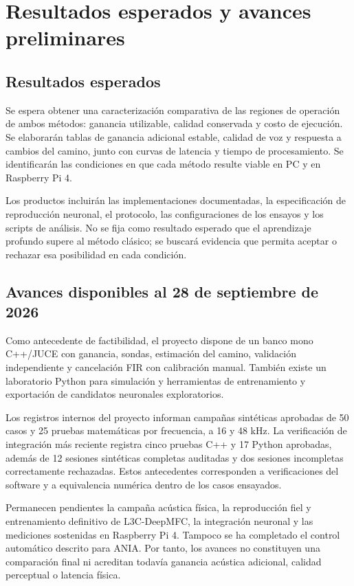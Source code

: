 \section{Resultados esperados y avances preliminares}
\subsection{Resultados esperados}
Se espera obtener una caracterización comparativa de las regiones de operación de ambos métodos: ganancia utilizable, calidad conservada y costo de ejecución. Se elaborarán tablas de ganancia adicional estable, calidad de voz y respuesta a cambios del camino, junto con curvas de latencia y tiempo de procesamiento. Se identificarán las condiciones en que cada método resulte viable en PC y en Raspberry Pi 4.

Los productos incluirán las implementaciones documentadas, la especificación de reproducción neuronal, el protocolo, las configuraciones de los ensayos y los scripts de análisis. No se fija como resultado esperado que el aprendizaje profundo supere al método clásico; se buscará evidencia que permita aceptar o rechazar esa posibilidad en cada condición.

\subsection{Avances disponibles al 28 de septiembre de 2026}
Como antecedente de factibilidad, el proyecto dispone de un banco mono C++/JUCE con ganancia, sondas, estimación del camino, validación independiente y cancelación FIR con calibración manual. También existe un laboratorio Python para simulación y herramientas de entrenamiento y exportación de candidatos neuronales exploratorios.

Los registros internos del proyecto informan campañas sintéticas aprobadas de 50 casos y 25 pruebas matemáticas por frecuencia, a 16 y 48 kHz. La verificación de integración más reciente registra cinco pruebas C++ y 17 Python aprobadas, además de 12 sesiones sintéticas completas auditadas y dos sesiones incompletas correctamente rechazadas\cite{estado2026}. Estos antecedentes corresponden a verificaciones del software y a equivalencia numérica dentro de los casos ensayados.

Permanecen pendientes la campaña acústica física, la reproducción fiel y entrenamiento definitivo de L3C-DeepMFC, la integración neuronal y las mediciones sostenidas en Raspberry Pi 4. Tampoco se ha completado el control automático descrito para ANIA. Por tanto, los avances no constituyen una comparación final ni acreditan todavía ganancia acústica adicional, calidad perceptual o latencia física.

